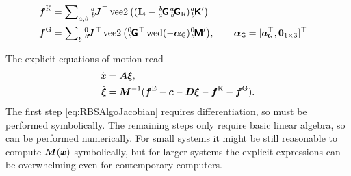 \begin{enumerate}
\begin{subequations}
\begin{align}
\\
 \genForceStiff &= \sumBodiesAB \bodyJac{\BidxI}{\BidxII}^\top \veeTwoOp \big( (\idMat[4] - \bodyHomoCoord{\BidxII}{\BidxI} \bodyHomoCoordR{\BidxI}{\BidxII}) \bodyStiffMatp{\BidxI}{\BidxII} \big)
\\
 \genForceGravity &= \sumBodies \bodyJac{0}{\BidxII}^\top \veeTwoOp \big( \bodyHomoCoord{0}{\BidxII}^{\top} \wedOp(-\gravityAccWrench) \bodyInertiaMatp{0}{\BidxII} \big), \qquad \gravityAccWrench = [\gravityAcc^\top, \tuple{0}_{1\times3}]^\top
\end{align}
\end{subequations} 
\end{enumerate}
The explicit equations of motion read
\begin{subequations}
\begin{align}
 \dot{\boldsymbol{x}} &= \boldsymbol{A} \boldsymbol{\xi}, 
\\
 \dot{\boldsymbol{\xi}} &= \boldsymbol{M}^{-1}(\boldsymbol{f}^{\mathrm{E}} - \boldsymbol{c} - \boldsymbol{D}\boldsymbol{\xi} - \boldsymbol{f}^{\mathrm{K}} - \boldsymbol{f}^{\mathrm{G}}).
\end{align}
\end{subequations} 
The first step \eqref{eq:RBSAlgoJacobian} requires differentiation, so must be performed symbolically.
The remaining steps only require basic linear algebra, so can be performed numerically.
For small systems it might be still reasonable to compute $\boldsymbol{M}(\boldsymbol{x})$ symbolically, but for larger systems the explicit expressions can be overwhelming even for contemporary computers.

